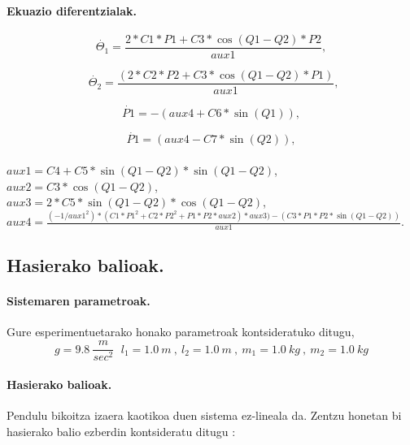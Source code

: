 \paragraph*{Ekuazio diferentzialak.}

\begin{equation*}
\dot{\Theta_1}= \frac {2*C1*P1+C3*\cos(Q1-Q2)*P2}{aux1},
\end{equation*}

\begin{equation*}
 \ \ \dot{\Theta_2}= \frac{(2*C2*P2+C3*\cos(Q1-Q2)*P1)}{aux1},
\end{equation*}

\begin{equation*}
\dot{P1}=-(aux4+C6*\sin(Q1)), 
\end{equation*}

\begin{equation*}
\dot{P1}=(aux4-C7*\sin(Q2)), 
\end{equation*}

\paragraph*{}
$aux1=C4+C5*\sin(Q1-Q2)*\sin(Q1-Q2)$, \\
$aux2=C3*\cos(Q1-Q2)$,\\
$aux3=2*C5*\sin(Q1-Q2)*\cos(Q1-Q2)$,\\
$aux4=\frac{(-1/aux1^2)*(C1*P1^2+C2*P2^2+P1*P2*aux2)*aux3)-(C3*P1*P2*\sin(Q1-Q2))}{aux1}.$ 


\subsection{Hasierako balioak.}

\paragraph*{\textbf{Sistemaren parametroak}.} 
Gure esperimentuetarako honako parametroak kontsideratuko ditugu,
\begin{equation*} \label{eq:17}
g=9.8 \ \frac{m}{sec^2}\,\ \ l_1=1.0 \ m \ , \ l_2=1.0 \ m\ , \ m_1=1.0 \ kg\ , \ m_2=1.0 \ kg
\end{equation*} 

\paragraph*{\textbf{Hasierako balioak}.}
Pendulu bikoitza izaera kaotikoa duen sistema ez-lineala da. Zentzu honetan bi hasierako balio ezberdin kontsideratu ditugu \cite{Papadrakakis}:

